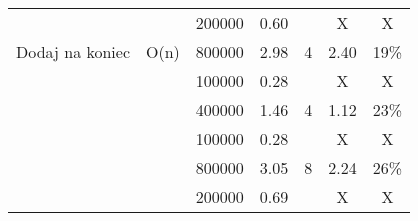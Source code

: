 \documentclass{article}
\begin{document}
\begin{table}[H]
{\begin{tabular}{|ccccccc|}
                    \multicolumn{1}{|c|}{} & \multicolumn{1}{c|}{} & \multicolumn{1}{c|}{200000} & \multicolumn{1}{c|}{0.60} & \multicolumn{1}{c|}{} & \multicolumn{1}{c|}{X} & X \\ \cline{3-4} \cline{6-7} 
                    \multicolumn{1}{|c|}{\multirow{-6}{*}{Dodaj   na koniec}} & \multicolumn{1}{c|}{\multirow{-6}{*}{O(n)}} & \multicolumn{1}{c|}{800000} & \multicolumn{1}{c|}{2.98} & \multicolumn{1}{c|}{\multirow{-2}{*}{4}} & \multicolumn{1}{c|}{2.40} & 19\% \\ \hline
                    \rowcolor[HTML]{F4FFF4} 
                    \multicolumn{1}{|c|}{\cellcolor[HTML]{F4FFF4}} & \multicolumn{1}{c|}{\cellcolor[HTML]{F4FFF4}} & \multicolumn{1}{c|}{\cellcolor[HTML]{F4FFF4}100000} & \multicolumn{1}{c|}{\cellcolor[HTML]{F4FFF4}0.28} & \multicolumn{1}{c|}{\cellcolor[HTML]{F4FFF4}} & \multicolumn{1}{c|}{\cellcolor[HTML]{F4FFF4}X} & X \\ \cline{3-4} \cline{6-7} 
                    \rowcolor[HTML]{F4FFF4} 
                    \multicolumn{1}{|c|}{\cellcolor[HTML]{F4FFF4}} & \multicolumn{1}{c|}{\cellcolor[HTML]{F4FFF4}} & \multicolumn{1}{c|}{\cellcolor[HTML]{F4FFF4}400000} & \multicolumn{1}{c|}{\cellcolor[HTML]{F4FFF4}1.46} & \multicolumn{1}{c|}{\multirow{-2}{*}{\cellcolor[HTML]{F4FFF4}4}} & \multicolumn{1}{c|}{\cellcolor[HTML]{F4FFF4}1.12} & 23\% \\ \cline{3-7} 
                    \rowcolor[HTML]{F4FFF4} 
                    \multicolumn{1}{|c|}{\cellcolor[HTML]{F4FFF4}} & \multicolumn{1}{c|}{\cellcolor[HTML]{F4FFF4}} & \multicolumn{1}{c|}{\cellcolor[HTML]{F4FFF4}100000} & \multicolumn{1}{c|}{\cellcolor[HTML]{F4FFF4}0.28} & \multicolumn{1}{c|}{\cellcolor[HTML]{F4FFF4}} & \multicolumn{1}{c|}{\cellcolor[HTML]{F4FFF4}X} & X \\ \cline{3-4} \cline{6-7} 
                    \rowcolor[HTML]{F4FFF4} 
                    \multicolumn{1}{|c|}{\cellcolor[HTML]{F4FFF4}} & \multicolumn{1}{c|}{\cellcolor[HTML]{F4FFF4}} & \multicolumn{1}{c|}{\cellcolor[HTML]{F4FFF4}800000} & \multicolumn{1}{c|}{\cellcolor[HTML]{F4FFF4}3.05} & \multicolumn{1}{c|}{\multirow{-2}{*}{\cellcolor[HTML]{F4FFF4}8}} & \multicolumn{1}{c|}{\cellcolor[HTML]{F4FFF4}2.24} & 26\% \\ \cline{3-7} 
                    \rowcolor[HTML]{F4FFF4} 
                    \multicolumn{1}{|c|}{\cellcolor[HTML]{F4FFF4}} & \multicolumn{1}{c|}{\cellcolor[HTML]{F4FFF4}} & \multicolumn{1}{c|}{\cellcolor[HTML]{F4FFF4}200000} & \multicolumn{1}{c|}{\cellcolor[HTML]{F4FFF4}0.69} & \multicolumn{1}{c|}{\cellcolor[HTML]{F4FFF4}} & \multicolumn{1}{c|}{\cellcolor[HTML]{F4FFF4}X} & X \\ \cline{3-4} \cline{6-7} 

\end{tabular}}
\end{table}
\end{document}
